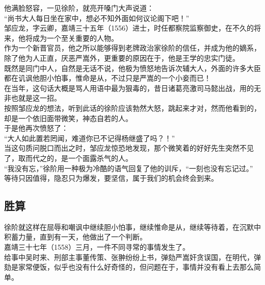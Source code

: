 \begin{multicols}{\theparacolNo}
他满脸怒容，一见徐阶，就亮开嗓门大声说道：\\

“尚书大人每日坐在家中，想必不知外面如何议论阁下吧！”\\

邹应龙，字云卿，嘉靖三十五年（1556）进士，时任都察院监察御史，在不久的将来，他将成为一个至关重要的人物。\\

作为一个新晋官员，他之所以能够得到老牌政治家徐阶的信任，并成为他的嫡系，除了他为人正直，厌恶严嵩外，更重要的原因在于，他是王学的忠实门徒。\\

既然是同门中人，自然是无话不说，他极为愤怒地告诉次辅大人，外面的许多大臣都在讥讽他胆小怕事，惟命是从，不过只是严嵩的一个小妾而已！\\

在当年，这句话大概是骂人用语中最为狠毒的，昔日诸葛亮激司马懿出战，用的无非也就是这一招。\\

按照邹应龙的想法，听到此话的徐阶应该勃然大怒，跳起来才对，然而他看到的，却是一个依旧面带微笑，神态自若的人。\\

于是他再次愤怒了：\\

“大人如此置若罔闻，难道你已不记得杨继盛了吗？！”\\

当这句质问脱口而出之时，邹应龙惊恐地发现，那个微笑着的好好先生突然不见了，取而代之的，是一个面露杀气的人。\\

“我没有忘，”徐阶用一种极为冷酷的语气回复了他的训斥，“一刻也没有忘记过。”\\

等待只因值得，隐忍只为爆发，要坚信，属于我们的机会终会到来。\\

\subsection{胜算}
徐阶就这样在屈辱和嘲讽中继续胆小怕事，继续惟命是从，继续等待着，在沉默中积蓄力量，直到有一天，他做出了一个判断。\\

嘉靖三十七年（1558）三月，一件不同寻常的事情发生了。\\

给事中吴时来、刑部主事董传策、张翀纷纷上书，弹劾严嵩奸贪误国，在明代，弹劾是家常便饭，似乎也没有什么好奇怪的，但问题在于，事情并没有看上去那么简单。\\


\end{multicols}
